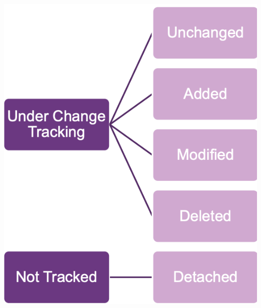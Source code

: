 \begin{center}
    \includegraphics[scale=.3]{graphic/efc/change tracker.png}
\end{center}
\vspace{-8pt}

